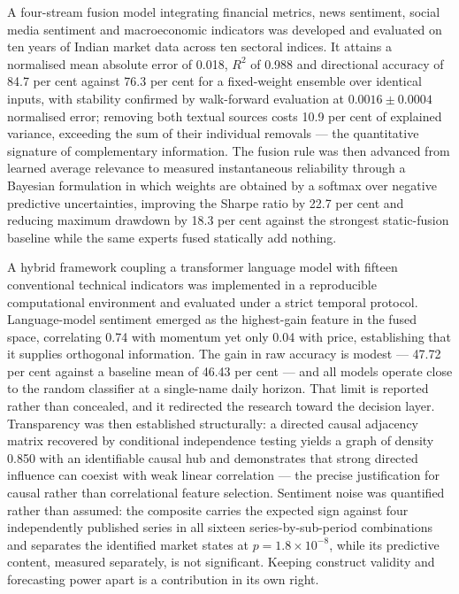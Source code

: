 A four-stream fusion model integrating financial metrics, news sentiment, social media sentiment
and macroeconomic indicators was developed and evaluated on ten years of Indian market data
across ten sectoral indices. It attains a normalised mean absolute error of 0.018, $R^2$ of
0.988 and directional accuracy of 84.7 per cent against 76.3 per cent for a fixed-weight
ensemble over identical inputs, with stability confirmed by walk-forward evaluation at
$0.0016 \pm 0.0004$ normalised error; removing both textual sources costs 10.9 per cent of
explained variance, exceeding the sum of their individual removals --- the quantitative
signature of complementary information. The fusion rule was then advanced from learned average
relevance to measured instantaneous reliability through a Bayesian formulation in which weights
are obtained by a softmax over negative predictive uncertainties, improving the Sharpe ratio by
22.7 per cent and reducing maximum drawdown by 18.3 per cent against the strongest
static-fusion baseline while the same experts fused statically add nothing.

A hybrid framework coupling a transformer language model with fifteen conventional technical
indicators was implemented in a reproducible computational environment and evaluated under a
strict temporal protocol. Language-model sentiment emerged as the highest-gain feature in the
fused space, correlating 0.74 with momentum yet only 0.04 with price, establishing that it
supplies orthogonal information. The gain in raw accuracy is modest --- 47.72 per cent against a
baseline mean of 46.43 per cent --- and all models operate close to the random classifier at a
single-name daily horizon. That limit is reported rather than concealed, and it redirected the
research toward the decision layer. Transparency was then established structurally: a directed
causal adjacency matrix recovered by conditional independence testing yields a graph of density
0.850 with an identifiable causal hub and demonstrates that strong directed influence can
coexist with weak linear correlation --- the precise justification for causal rather than
correlational feature selection. Sentiment noise was quantified rather than assumed: the
composite carries the expected sign against four independently published series in all sixteen
series-by-sub-period combinations and separates the identified market states at
$p = 1.8 \times 10^{-8}$, while its predictive content, measured separately, is not significant.
Keeping construct validity and forecasting power apart is a contribution in its own right.

